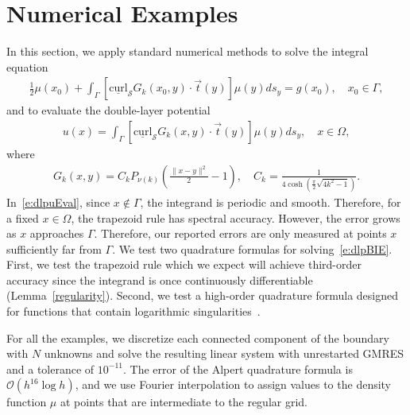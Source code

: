 \documentclass[final]{siamltex}
\newcommand{\C}{C_k}
\renewcommand{\S} {\mathcal{S}}
\begin{document}
\section{Numerical Examples}
\label{s:numerics}
In this section, we apply standard numerical methods to solve the
integral equation
\begin{align}
  \label{e:dlpBIE}
  \frac{1}{2}\mu(x_{0}) + \int_{\Gamma}
    [\underline{\mbox{curl}}_{\S}G_{k}(x_{0},y) \cdot
    \vec{t}(y)] \mu(y)ds_{y} = g(x_{0}), \quad x_{0} \in \Gamma,
\end{align}
and to evaluate the double-layer potential
\begin{align}
  \label{e:dlpuEval}
  u(x) = \int_{\Gamma} [\underline{\mbox{curl}}_{\S}G_{k}(x,y) 
    \cdot \vec{t}(y)] \mu(y)ds_{y}, \quad x \in \Omega,
\end{align}
where
\begin{align*}
  G_{k}(x,y) = \C P_{\nu(k)} \left(
    \frac{\|x - y\|^{2}}{2} - 1\right), \quad 
  \C = \frac{1}{4\cosh\left(\frac{\pi}{2}\sqrt{4k^{2}-1}\right)}.
\end{align*}
In~\eqref{e:dlpuEval}, since $x \notin \Gamma$, the integrand is
periodic and smooth.  Therefore, for a fixed $x\in \Omega$, the
trapezoid rule has spectral accuracy.  However, the error grows as $x$
approaches $\Gamma$.  Therefore, our reported errors are only measured
at points $x$ sufficiently far from $\Gamma$.  We test two quadrature
formulas for solving~\eqref{e:dlpBIE}.  First, we test the trapezoid
rule which we expect will achieve third-order accuracy since the
integrand is once continuously differentiable (Lemma~\ref{regularity}).
Second, we test a high-order quadrature formula designed for functions
that contain logarithmic singularities~\cite{alpert}.

For all the examples, we discretize each connected component of the
boundary with $N$ unknowns and solve the resulting linear system with
unrestarted GMRES and a tolerance of $10^{-11}$.  The error of the
Alpert quadrature formula is $\mathcal{O}(h^{16}\log h)$, and we use
Fourier interpolation to assign values to the density function $\mu$ at
points that are intermediate to the regular grid.
\end{document}
